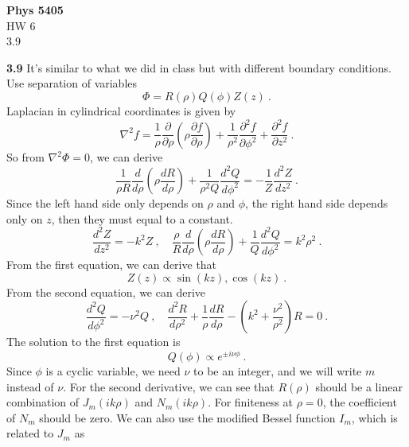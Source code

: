 \documentclass[12pt]{article}
\begin{document}
\begin{center}
{\bf Phys 5405}\\
HW 6 \\
3.9
\end{center}
{\bf 3.9}
It's similar to what we did in class but with different boundary conditions. Use separation of variables
\begin{equation}
    \Phi = R(\rho) Q(\phi) Z(z)~.
\end{equation}
Laplacian in cylindrical coordinates is given by
\begin{equation}
    \nabla^2 f = \frac 1\rho\frac{\partial}{\partial \rho}\left(\rho \frac{\partial f}{\partial \rho}\right)+ \frac{1}{\rho^2} \frac{\partial^2 f}{\partial \phi^2} + \frac{\partial^2 f}{\partial z^2}~.
\end{equation}
So from $\nabla^2 \Phi = 0$, we can derive
\begin{equation}
    \frac{1}{\rho R} \frac{d}{d \rho}\left(\rho \frac{d R}{d \rho}\right)+ \frac{1}{\rho^2 Q} \frac{d^2 Q}{d\phi^2} = -\frac{1}{Z} \frac{d^2 Z}{d z^2}~.
\end{equation}
Since the left hand side only depends on $\rho$ and $\phi$, the right hand side depends only on $z$, then they must equal to a constant.
\begin{equation}
    \frac{d^2 Z}{dz^2} = -k^2 Z~,\quad \frac{\rho}{R} \frac{d}{d\rho}\left(\rho \frac{d R}{d \rho}\right) + \frac 1 Q \frac{d^2 Q}{d \phi^2} = k^2 \rho^2~.
\end{equation}
From the first equation, we can derive that
\begin{equation}
    Z(z) \propto \sin(kz), \cos(kz)~.
\end{equation}
From the second equation, we can derive
\begin{equation}
    \frac{d^2 Q}{d\phi^2} = -\nu^2  Q~, \quad \frac{d^2R}{d \rho^2} + \frac 1 \rho \frac{dR}{d\rho} -\left(k^2 + \frac{\nu^2}{\rho^2}\right)R=0~.
\end{equation}
The solution to the first equation is
\begin{equation}
    Q(\phi) \propto e^{\pm i \nu \phi}~.
\end{equation}
Since $\phi$ is a cyclic variable, we need $\nu$ to be an integer, and we will write $m$ instead of $\nu$. For the second derivative, we can see that $R(\rho)$ should be a linear combination of $J_m(ik\rho)$ and $N_m(ik\rho)$. For finiteness at $\rho = 0$, the coefficient of $N_m$ should be zero. We can also use the modified Bessel function $I_m$, which is related to $J_m$ as
\end{document}
